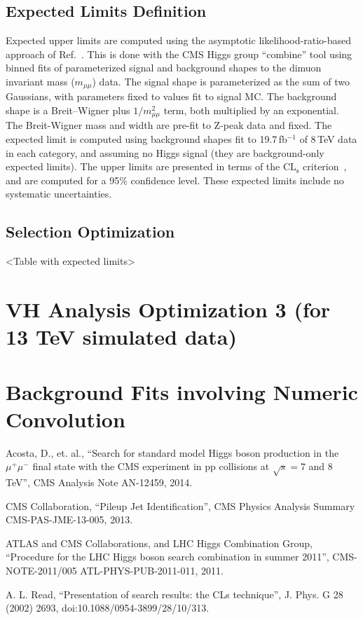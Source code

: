 \documentclass[12pt]{article}
\begin{document}
\subsection{Expected Limits Definition}

Expected upper limits are computed using the asymptotic likelihood-ratio-based approach of 
Ref.~\cite{stats}.  This is done with the CMS Higgs group ``combine'' tool using binned
fits of parameterized signal and background shapes to the dimuon invariant mass 
($m_{\mu\mu}$) data.  The signal shape is parameterized
as the sum of two Gaussians, with parameters fixed to values fit to signal MC.
The background shape is a Breit--Wigner plus $1/m_{\mu\mu}^2$ term, both multiplied
by an exponential.  The Breit-Wigner mass and width are pre-fit to Z-peak data and fixed.
The expected limit is computed
using background shapes fit to 19.7\,fb$^{-1}$ of 8\,TeV data in each category,
and assuming no Higgs signal (they are background-only expected limits).  The upper
limits are presented in terms of the $\mathrm{CL_s}$ criterion~\cite{cls}, and are computed for 
a 95\% confidence level.  These expected limits include no systematic uncertainties.

\subsection{Selection Optimization}

<Table with expected limits>

\section{VH Analysis Optimization 3 (for 13 TeV simulated data)}

\section{Background Fits involving Numeric Convolution}

\begin{thebibliography}{9}

  Acosta, D., et. al.,
  ``Search for standard model Higgs boson production in the $\mu^+\mu^-$ final state with the CMS experiment in pp collisions at $\sqrt{s}=7$ and 8\, TeV'',
  CMS Analysis Note AN-12459,
  2014.

  CMS Collaboration, ``Pileup Jet Identification'', 
  CMS Physics Analysis Summary CMS-PAS-JME-13-005, 
  2013.

  ATLAS and CMS Collaborations, and LHC Higgs Combination Group, ``Procedure for
  the LHC Higgs boson search combination in summer 2011'', 
  CMS-NOTE-2011/005 ATL-PHYS-PUB-2011-011, 2011.

  A. L. Read, ``Presentation of search results: the CLs technique'', J. Phys. G 28 (2002) 2693,
  doi:10.1088/0954-3899/28/10/313.

\end{thebibliography}
\end{document}
